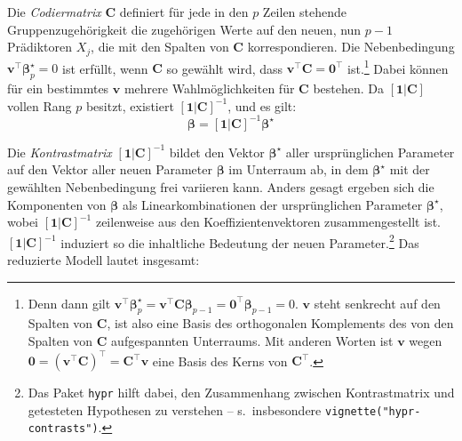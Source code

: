 Die \emph{Codiermatrix} $\bm{C}$ definiert für jede in den $p$ Zeilen stehende Gruppenzugehörigkeit die zugehörigen Werte auf den neuen, nun $p-1$ Prädiktoren $X_{j}$, die mit den Spalten von $\bm{C}$ korrespondieren. Die Nebenbedingung $\bm{v}^{\top} \bm{\beta}_{p}^{\star} = 0$ ist erfüllt, wenn $\bm{C}$ so gewählt wird, dass $\bm{v}^{\top} \bm{C} = \bm{0}^{\top}$ ist.\footnote{Denn dann gilt $\bm{v}^{\top} \bm{\beta}_{p}^{\star} = \bm{v}^{\top} \bm{C} \bm{\beta}_{p-1} = \bm{0}^{\top} \bm{\beta}_{p-1} = 0$. $\bm{v}$ steht senkrecht auf den Spalten von $\bm{C}$, ist also eine Basis des orthogonalen Komplements des von den Spalten von $\bm{C}$ aufgespannten Unterraums. Mit anderen Worten ist $\bm{v}$ wegen $\bm{0} = (\bm{v}^{\top} \bm{C})^{\top} = \bm{C}^{\top} \bm{v}$ eine Basis des Kerns von $\bm{C}^{\top}$.} Dabei können für ein bestimmtes $\bm{v}$ mehrere Wahlmöglichkeiten für $\bm{C}$ bestehen. Da $[\bm{1} | \bm{C}]$ vollen Rang $p$ besitzt, existiert $[\bm{1} | \bm{C}]^{-1}$, und es gilt:
\begin{equation*}
\bm{\beta} = [\bm{1} | \bm{C}]^{-1} \bm{\beta}^{\star}
\end{equation*}

Die \emph{Kontrastmatrix} $[\bm{1} | \bm{C}]^{-1}$ bildet den Vektor $\bm{\beta}^{\star}$ aller ursprünglichen Parameter auf den Vektor aller neuen Parameter $\bm{\beta}$ im Unterraum ab, in dem $\bm{\beta}^{\star}$ mit der gewählten Nebenbedingung frei variieren kann. Anders gesagt ergeben sich die Komponenten von $\bm{\beta}$ als Linearkombinationen der ursprünglichen Parameter $\bm{\beta}^{\star}$, wobei $[\bm{1} | \bm{C}]^{-1}$ zeilenweise aus den Koeffizientenvektoren zusammengestellt ist. $[\bm{1} | \bm{C}]^{-1}$ induziert so die inhaltliche Bedeutung der neuen Parameter.\footnote{Das Paket  \lstinline!hypr! \cite{Rabe2023} hilft dabei, den Zusammenhang zwischen Kontrastmatrix und getesteten Hypothesen zu verstehen -- s.\ insbesondere \lstinline!vignette("hypr-contrasts")!.} Das reduzierte Modell lautet insgesamt:

